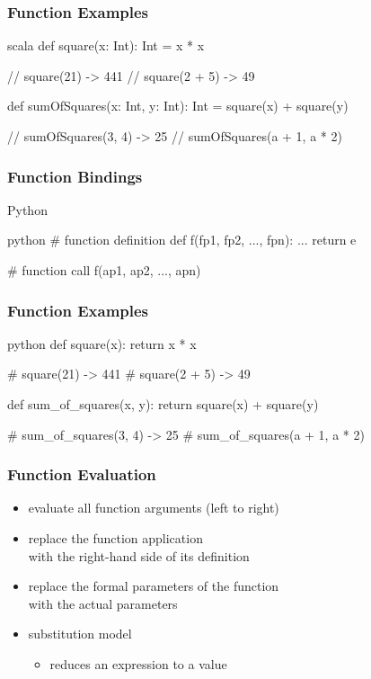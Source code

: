 \documentclass[dvipsnames]{beamer}
\theoremstyle{plain}
\begin{document}
\begin{frame}[fragile]
  \frametitle{Function Examples}

  \begin{example}[Scala]
    \begin{pygments}{scala}
def square(x: Int): Int = x * x

// square(21) -> 441
// square(2 + 5) -> 49

def sumOfSquares(x: Int, y: Int): Int =
    square(x) + square(y)

// sumOfSquares(3, 4) -> 25
// sumOfSquares(a + 1, a * 2)
    \end{pygments}
  \end{example}
\end{frame}

\begin{frame}[fragile]
  \frametitle{Function Bindings}

  \begin{block}{Python}
    \begin{pygments}{python}
# function definition
def f(fp1, fp2, ..., fpn):
    ...
    return e

# function call
f(ap1, ap2, ..., apn)
    \end{pygments}
  \end{block}
\end{frame}

\begin{frame}[fragile]
  \frametitle{Function Examples}

  \begin{example}[Python]
    \begin{pygments}{python}
def square(x):
    return x * x

# square(21) -> 441
# square(2 + 5) -> 49

def sum_of_squares(x, y):
    return square(x) + square(y)

# sum_of_squares(3, 4) -> 25
# sum_of_squares(a + 1, a * 2)
    \end{pygments}
  \end{example}
\end{frame}

\begin{frame}
  \frametitle{Function Evaluation}

  \begin{itemize}
    \item evaluate all function arguments (left to right)
    \item replace the function application\\
      with the right-hand side of its definition
    \item replace the formal parameters of the function\\
      with the actual parameters

    \pause
    \bigskip
    \item \alert{substitution model}
    \begin{itemize}
      \item reduces an expression to a value
    \end{itemize}
  \end{itemize}
\end{frame}
\end{document}
